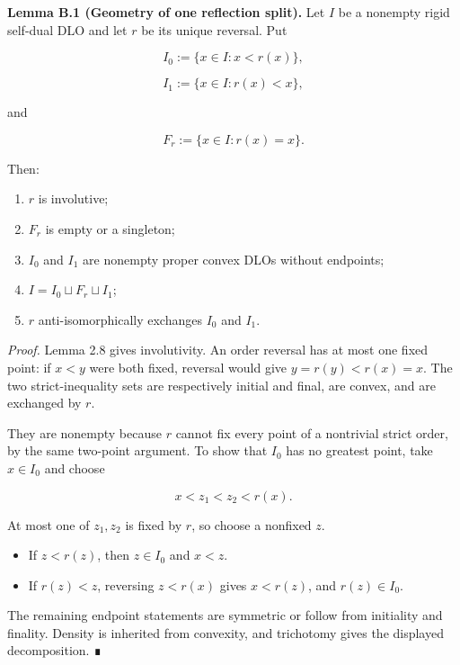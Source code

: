 \documentclass[
  english,
  11pt,
  reqno]{amsart}
\newcounter{none} %
\providecommand{\tightlist}{%
  \setlength{\itemsep}{0pt}\setlength{\parskip}{0pt}}
\begin{document}
\protect{}\label{lem:b-1-reflection-split}

\textbf{Lemma B.1 (Geometry of one reflection split).} Let \(I\) be a
nonempty rigid self-dual DLO and let \(r\) be its unique reversal. Put

\[
I_0:=\{x\in I:x<r(x)\},
\]

\[
I_1:=\{x\in I:r(x)<x\},
\]

and

\[
F_r:=\{x\in I:r(x)=x\}.
\]

Then:

\begin{enumerate}
\tightlist
\item
  \(r\) is involutive;
\item
  \(F_r\) is empty or a singleton;
\item
  \(I_0\) and \(I_1\) are nonempty proper convex DLOs without endpoints;
\item
  \(I=I_0\sqcup F_r\sqcup I_1\);
\item
  \(r\) anti-isomorphically exchanges \(I_0\) and \(I_1\).
\end{enumerate}

\emph{Proof.} Lemma 2.8 gives involutivity. An order reversal has at
most one fixed point: if \(x<y\) were both fixed, reversal would give
\(y=r(y)<r(x)=x\). The two strict-inequality sets are respectively
initial and final, are convex, and are exchanged by \(r\).

They are nonempty because \(r\) cannot fix every point of a nontrivial
strict order, by the same two-point argument. To show that \(I_0\) has
no greatest point, take \(x\in I_0\) and choose

\[
x<z_1<z_2<r(x).
\]

At most one of \(z_1,z_2\) is fixed by \(r\), so choose a nonfixed
\(z\).

\begin{itemize}
\tightlist
\item
  If \(z<r(z)\), then \(z\in I_0\) and \(x<z\).
\item
  If \(r(z)<z\), reversing \(z<r(x)\) gives \(x<r(z)\), and
  \(r(z)\in I_0\).
\end{itemize}

The remaining endpoint statements are symmetric or follow from
initiality and finality. Density is inherited from convexity, and
trichotomy gives the displayed decomposition. ∎

\protect{}\label{lem:b-2-singleton-placement}
\end{document}
